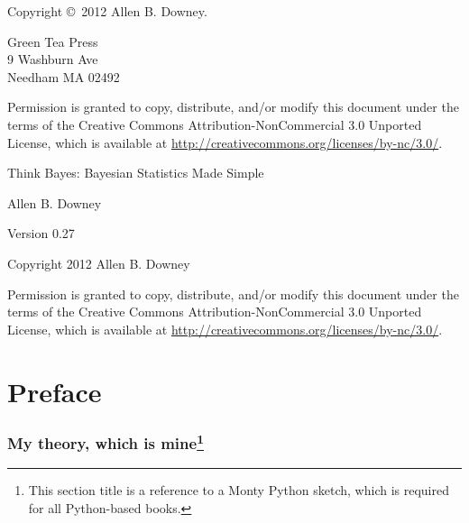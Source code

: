 \documentclass[12pt]{book}
\newcommand{\thetitle}{Think Bayes: Bayesian Statistics Made Simple}
\newcommand{\theversion}{0.27}
\begin{document}
\begin{latexonly}
Copyright \copyright ~2012 Allen B. Downey.


\vspace{0.2in}

\begin{flushleft}
Green Tea Press       \\
9 Washburn Ave \\
Needham MA 02492
\end{flushleft}

Permission is granted to copy, distribute, and/or modify this document
under the terms of the Creative Commons Attribution-NonCommercial 3.0 Unported
License, which is available at \url{http://creativecommons.org/licenses/by-nc/3.0/}.

\vspace{0.2in}

\end{latexonly}



\begin{htmlonly}


{\Large \thetitle}

{\large Allen B. Downey}

Version \theversion

\vspace{0.25in}

Copyright 2012 Allen B. Downey

\vspace{0.25in}

Permission is granted to copy, distribute, and/or modify this document
under the terms of the Creative Commons Attribution-NonCommercial 3.0
Unported License, which is available at
\url{http://creativecommons.org/licenses/by-nc/3.0/}.

\setcounter{chapter}{-1}

\end{htmlonly}

\fi

\chapter{Preface}
\label{preface}

\subsection*{My theory, which is mine\footnote{This section title
is a reference to a Monty Python sketch, which is required for
all Python-based books.}}
\end{document}
